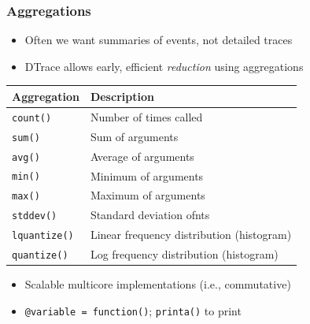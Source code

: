 \begin{frame}
  \frametitle{Aggregations}

  \begin{itemize}
    \item Often we want summaries of events, not detailed traces
    \item DTrace allows early, efficient \textit{reduction} using aggregations
  \end{itemize}

  \pause

  \begin{center}
    \begin{small}
      \begin{tabular}{ll}
        \hline
        Aggregation & Description \\
        \hline
	\texttt{count()} & Number of times called \\
	\texttt{sum()} & Sum of arguments \\
	\texttt{avg()} & Average of arguments \\
	\texttt{min()} & Minimum of arguments \\
	\texttt{max()} & Maximum of arguments \\
	\texttt{stddev()} & Standard deviation ofnts \\
	\texttt{lquantize()} & Linear frequency distribution (histogram) \\
	\texttt{quantize()} & Log frequency distribution (histogram) \\
        \hline
      \end{tabular}
    \end{small}
  \end{center}

  \pause

  \begin{itemize}
    \item Scalable multicore implementations (i.e., commutative)
    \item \texttt{@variable = function()}; \texttt{printa()} to print
  \end{itemize}

\end{frame}

